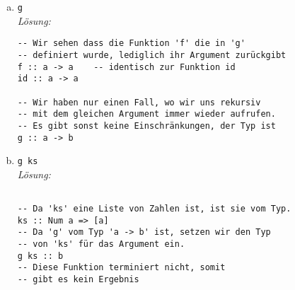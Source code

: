 \documentclass{article}
\begin{document}
\begin{enumerate} [a)]
\begin{mdframed}[backgroundcolor=bg]
\begin{verbatim}
f pred 0 [5,7]    -- Erster Fall von 'f',
                  -- Liste ist nicht leer

=> if pred 5     -- (5 < 0) => False
      then f (not . pred) 0 [7]
      else f (pred) 0 [7]

f pred 0 [7]      -- Erster Fall von 'f',
                  -- Liste ist nicht leer

=> if pred 7      -- (7 < 0) => False
       then f (not . pred) 0 []
       else f (pred) 0 []

f pred 0 []       -- Zweiter Fall von 'f',
                  -- da Liste leer Z.8

=> pred 0 => 0 < 0 => False
        \end{verbatim}
    \end{mdframed}

\newpage

    \item \texttt{g} \\[2mm]
    \textit{Lösung:}
    \begin{mdframed}[backgroundcolor=bg]
        \begin{verbatim}
-- Wir sehen dass die Funktion 'f' die in 'g'
-- definiert wurde, lediglich ihr Argument zurückgibt
f :: a -> a    -- identisch zur Funktion id
id :: a -> a

-- Wir haben nur einen Fall, wo wir uns rekursiv
-- mit dem gleichen Argument immer wieder aufrufen.
-- Es gibt sonst keine Einschränkungen, der Typ ist
g :: a -> b
        \end{verbatim}
    \end{mdframed}

    \item \texttt{g ks} \\[2mm]
    \textit{Lösung:}
    \begin{mdframed}[backgroundcolor=bg]
        \begin{verbatim}

-- Da 'ks' eine Liste von Zahlen ist, ist sie vom Typ.
ks :: Num a => [a]
-- Da 'g' vom Typ 'a -> b' ist, setzen wir den Typ
-- von 'ks' für das Argument ein.
g ks :: b
-- Diese Funktion terminiert nicht, somit
-- gibt es kein Ergebnis
        \end{verbatim}
    \end{mdframed}
\end{enumerate}
\end{document}
